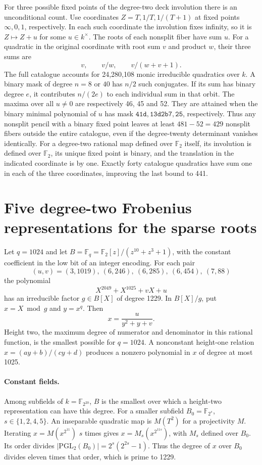 \documentclass[11pt]{article}
\newcommand{\F}{\mathbb F_2}
\begin{document}
For three possible fixed points of the degree-two deck involution
there is an unconditional count. Use coordinates \(Z=T,1/T,1/(T+1)\)
at fixed points \(\infty,0,1\), respectively. In each such coordinate
the involution fixes infinity, so it is \(Z\mapsto Z+u\) for some
\(u\in k^\times\). The roots of each nonsplit fiber have sum \(u\).
For a quadratic in the original coordinate with root sum \(v\) and
product \(w\), their three sums are
\[
       v,\qquad v/w,\qquad v/(w+v+1).
\]
The full catalogue accounts for 24,280,108 monic irreducible
quadratics over \(k\). A binary mask of degree \(n=8\) or \(40\)
has \(n/2\) such conjugates. If its sum has binary degree \(e\),
it contributes \(n/(2e)\) to each individual sum in that orbit.
The maxima over all \(u\ne0\) are respectively 46, 45 and 52.
They are attained when the binary minimal polynomial of \(u\)
has mask \(\mathtt{41d},\mathtt{13d2b7},\mathtt{25}\),
respectively. Thus any nonsplit pencil with a binary fixed point
leaves at least \(481-52=429\) nonsplit fibers outside the entire
catalogue, even if the degree-twenty determinant vanishes identically.
For a degree-two rational map defined over \(\F\) itself, its
involution is defined over \(\F\), its unique fixed point is binary,
and the translation in the indicated coordinate is by one.
Exactly forty catalogue quadratics have sum one in each of the
three coordinates, improving the last bound to 441.

\section{Five degree-two Frobenius representations for the sparse roots}
\label{sec:height-two-models}
Let \(q=1024\) and let
\(B=\mathbb F_q=\F[z]/(z^{10}+z^3+1)\), with the constant coefficient
in the low bit of an integer encoding. For each pair
\[
   (u,v)=(3,1019),\ (6,246),\ (6,285),\ (6,454),\ (7,88)
\]
the polynomial
\[
  X^{2049}+X^{1025}+vX+u
\]
has an irreducible factor \(g\in B[X]\) of degree 1229. In
\(B[X]/g\), put \(x=X\bmod g\) and \(y=x^q\). Then
\[
    x=\frac{u}{y^2+y+v}.
\]
Height two, the maximum degree of numerator and denominator in this
rational function, is the smallest possible for \(q=1024\).
A nonconstant height-one relation \(x=(ay+b)/(cy+d)\) produces
a nonzero polynomial in \(x\) of degree at most 1025.

\paragraph{Constant fields.}
Among subfields of \(k=\mathbb F_{2^{20}}\), \(B\) is the
smallest over which a height-two representation can have this
degree. For a smaller subfield \(B_0=\mathbb F_{2^s}\),
\(s\in\{1,2,4,5\}\).
An inseparable quadratic map is \(M(T^2)\) for a projectivity
\(M\). Iterating \(x=M(x^{2^{11}})\) \(s\) times gives
\(x=M_s(x^{2^{11s}})\), with \(M_s\) defined over \(B_0\).
Its order divides \(|\mathrm{PGL}_2(B_0)|=2^s(2^{2s}-1)\).
Thus the degree of \(x\) over \(B_0\) divides eleven times
that order, which is prime to 1229.
\end{document}
